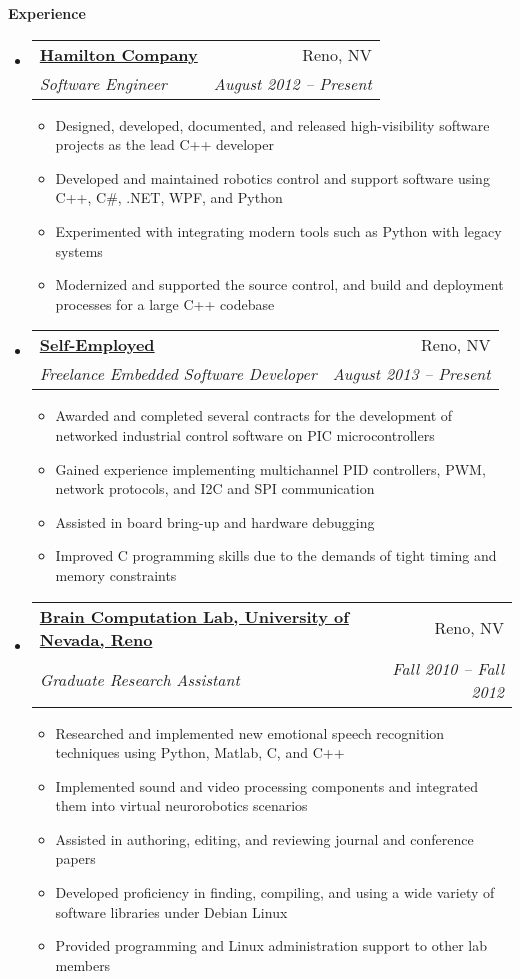 \documentclass[letterpaper,11pt]{article}
\makeatletter
\newcommand{\resitem}[1]{\item #1 \vspace{-2pt}}
\newcommand{\resheading}[1]{{\large \colorbox{mygrey}{\begin{minipage}{\textwidth}{\textbf{#1 \vphantom{p\^{E}}}}\end{minipage}}}}
\newcommand{\ressubheading}[4]{
\begin{tabular*}{6.5in}{l@{\extracolsep{\fill}}r}
		\textbf{#1} & #2 \\
		\textit{#3} & \textit{#4} \\
\end{tabular*}\vspace{-6pt}}
\makeatother
\begin{document}
\resheading{Experience}
	\begin{itemize}
		\item 
			\ressubheading{\href{http://www.hamiltoncompany.com/}{Hamilton Company}}{Reno, NV}{Software Engineer}{August 2012 -- Present}
				{ \footnotesize
				\begin{itemize}
					\resitem{Designed, developed, documented, and released high-visibility software projects as the lead C++ developer}
					\resitem{Developed and maintained robotics control and support software using C++, C\#, .NET, WPF, and Python}
					\resitem{Experimented with integrating modern tools such as Python with legacy systems}
					\resitem{Modernized and supported the source control, and build and deployment processes for a large C++ codebase}					
				\end{itemize}
				}		
				
		\item 
			\ressubheading{\href{https://www.linkedin.com/in/gferneyhough}{Self-Employed}}{Reno, NV}{Freelance Embedded Software Developer}{August 2013 -- Present}
				{ \footnotesize
				\begin{itemize}
					\resitem{Awarded and completed several contracts for the development of networked industrial control software on PIC microcontrollers}
					\resitem{Gained experience implementing multichannel PID controllers, PWM, network protocols, and I2C and SPI communication}
					\resitem{Assisted in board bring-up and hardware debugging}
					\resitem{Improved C programming skills due to the demands of tight timing and memory constraints}
				\end{itemize}
				}
				
		\item 
			\ressubheading{\href{http://www.cse.unr.edu/brain/}{Brain Computation Lab, University of Nevada, Reno}}{Reno, NV}{Graduate Research Assistant}{Fall 2010 -- Fall 2012}
				{ \footnotesize
				\begin{itemize}
					\resitem{Researched and implemented new emotional speech recognition techniques using Python, Matlab, C, and C++}
					\resitem{Implemented sound and video processing components and integrated them into virtual neurorobotics scenarios}
					\resitem{Assisted in authoring, editing, and reviewing journal and conference papers}
					\resitem{Developed proficiency in finding, compiling, and using a wide variety of software libraries under Debian Linux}
					\resitem{Provided programming and Linux administration support to other lab members}
				\end{itemize}
				}
	\end{itemize}  %
\end{document}
